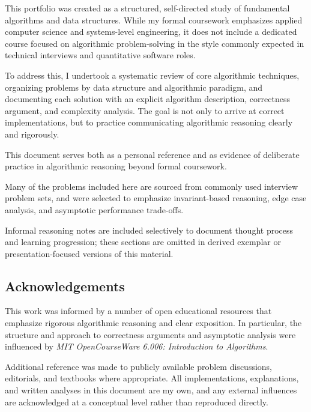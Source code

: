 This portfolio was created as a structured, self-directed study of fundamental
algorithms and data structures. While my formal coursework emphasizes applied
computer science and systems-level engineering, it does not include a dedicated
course focused on algorithmic problem-solving in the style commonly expected in
technical interviews and quantitative software roles.

To address this, I undertook a systematic review of core algorithmic techniques,
organizing problems by data structure and algorithmic paradigm, and documenting
each solution with an explicit algorithm description, correctness argument, and
complexity analysis. The goal is not only to arrive at correct implementations,
but to practice communicating algorithmic reasoning clearly and rigorously.

This document serves both as a personal reference and as evidence of deliberate
practice in algorithmic reasoning beyond formal coursework.

Many of the problems included here are sourced from commonly used interview
problem sets, and were selected to emphasize invariant-based reasoning, edge
case analysis, and asymptotic performance trade-offs.

Informal reasoning notes are included selectively to document thought process
and learning progression; these sections are omitted in derived exemplar or
presentation-focused versions of this material.


\subsection{Acknowledgements}

This work was informed by a number of open educational resources that emphasize
rigorous algorithmic reasoning and clear exposition. In particular, the structure
and approach to correctness arguments and asymptotic analysis were influenced by
\emph{MIT OpenCourseWare 6.006: Introduction to Algorithms}.

Additional reference was made to publicly available problem discussions,
editorials, and textbooks where appropriate. All implementations, explanations,
and written analyses in this document are my own, and any external influences are
acknowledged at a conceptual level rather than reproduced directly.
